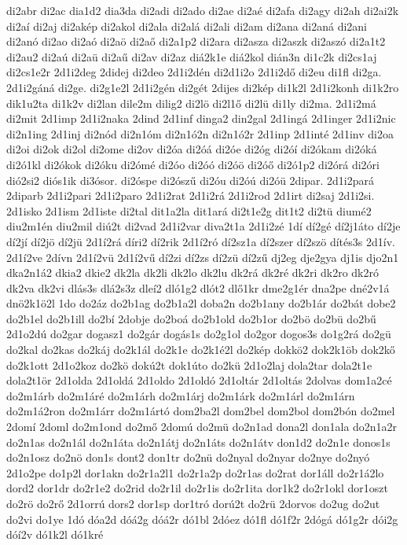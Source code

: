 {di2abr
di2ac
dia1d2
dia3da
di2adi
di2ado
di2ae
di2aé
di2afa
di2agy
di2ah
di2ai2k
di2aí
di2aj
di2akép
di2akol
di2ala
di2alá
di2ali
di2am
di2ana
di2aná
di2ani
di2anó
di2ao
di2aó
di2aö
di2aő
di2a1p2
di2ara
di2asza
di2aszk
di2aszó
di2a1t2
di2au2
di2aú
di2aü
di2aű
di2av
di2az
diá2k1e
diá2kol
dián3n
di1c2k
di2cs1aj
di2cs1e2r
2d1i2deg
2didej
di2deo
2d1i2dén
di2d1i2o
2d1i2dő
di2eu
di1fl
di2ga.
2d1i2gáná
di2ge.
di2g1e2l
2d1i2gén
di2gét
2dijes
di2kép
di1k2l
2d1i2konh
di1k2ro
dik1u2ta
di1k2v
di2lan
dile2m
dilig2
di2lö
di2l1ő
di2lü
di1ly
di2ma.
2d1i2má
di2mit
2d1imp
2d1i2naka
2dind
2d1inf
dinga2
din2gal
2d1ingá
2d1inger
2d1i2nic
di2n1ing
2d1inj
di2nód
di2n1óm
di2n1ó2n
di2n1ó2r
2d1inp
2d1inté
2d1inv
di2oa
di2oi
di2ok
di2ol
di2ome
di2ov
di2óa
di2óá
di2óe
di2óg
di2óí
di2ókam
di2óká
di2ó1kl
di2ókok
di2óku
di2ómé
di2óo
di2óó
di2óö
di2óő
di2ó1p2
di2órá
di2óri
dió2si2
diós1ik
di3ósor.
di2óspe
di2ószű
di2óu
di2óú
di2óü
2dipar.
2d1i2pará
2diparb
2d1i2pari
2d1i2paro
2d1i2rat
2d1i2rá
2d1i2rod
2d1irt
di2saj
2d1i2si.
2d1isko
2d1ism
2d1iste
di2tal
dit1a2la
dit1ará
di2t1e2g
dit1t2
di2tü
diumé2
diu2m1én
diu2mil
diú2t
di2vad
2d1i2var
diva2t1a
2d1i2zé
1dí
dí2gé
dí2j1áto
dí2je
dí2jí
dí2jö
dí2jü
2d1í2rá
díri2
dí2rik
2d1í2ró
dí2sz1a
dí2szer
dí2szö
dítés3s
2d1ív.
2d1í2ve
2dívn
2d1í2vü
2d1í2vű
dí2zi
dí2zs
dí2zü
dí2zű
dj2eg
dje2gya
dj1is
djo2n1
dka2n1á2
dkia2
dkie2
dk2la
dk2li
dk2lo
dk2lu
dk2rá
dk2ré
dk2ri
dk2ro
dk2ró
dk2va
dk2vi
dlás3s
dlá2s3z
dleí2
dló1g2
dlót2
dlő1kr
dme2g1ér
dna2pe
dné2v1á
dnö2k1ö2l
1do
do2áz
do2b1ag
do2b1a2l
doba2n
do2b1any
do2b1ár
do2bát
dobe2
do2b1el
do2b1ill
do2bí
2dobje
do2boá
do2b1old
do2b1or
do2bö
do2bü
do2bű
2d1o2dú
do2gar
dogasz1
do2gár
dogás1s
do2g1ol
do2gor
dogos3s
do1g2rá
do2gü
do2kal
do2kas
do2káj
do2k1ál
do2k1e
do2k1é2l
do2kép
dokkö2
dok2k1öb
dok2kő
do2k1ott
2d1o2koz
do2kö
dokú2t
dok1úto
do2kü
2d1o2laj
dola2tar
dola2t1e
dola2t1ör
2d1olda
2d1oldá
2d1oldo
2d1oldó
2d1oltár
2d1oltás
2dolvas
dom1a2cé
do2m1árb
do2m1áré
do2m1árh
do2m1árj
do2m1árk
do2m1árl
do2m1árn
do2m1á2ron
do2m1árr
do2m1ártó
dom2ba2l
dom2bel
dom2bol
dom2bón
do2mel
2domí
2doml
do2m1ond
do2mő
2domú
do2mü
do2n1ad
dona2l
don1ala
do2n1a2r
do2n1as
do2n1ál
do2n1áta
do2n1átj
do2n1áts
do2n1átv
don1d2
do2n1e
donos1s
do2n1osz
do2nö
don1s
dont2
don1tr
do2nü
do2nyal
do2nyar
do2nye
do2nyó
2d1o2pe
do1p2l
dor1akn
do2r1a2l1
do2r1a2p
do2r1as
do2rat
dor1áll
do2r1á2lo
dord2
dor1dr
do2r1e2
do2rid
do2r1il
do2r1is
do2r1ita
dor1k2
do2r1okl
dor1oszt
do2rö
do2rő
2d1orrú
dors2
dor1sp
dor1tró
dorú2t
do2rü
2dorvos
do2ug
do2ut
do2vi
do1ye
1dó
dóa2d
dóá2g
dóá2r
dó1bl
2dóez
dó1fl
dó1f2r
2dógá
dó1g2r
dói2g
dóí2v
dó1k2l
dó1kré
}
